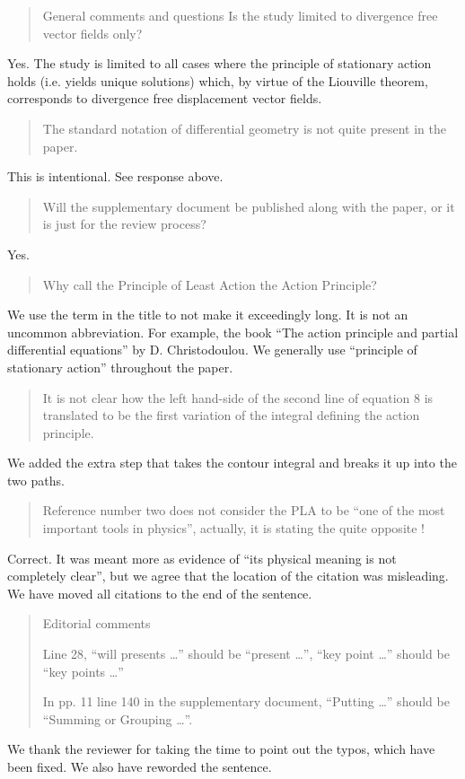 \documentclass[11pt, executivepaper]{article}
\begin{document}
 
\begin{quote}
 General comments and questions
 Is the study limited to divergence free vector fields only? 
\end{quote}
Yes. The study is limited to all cases where the principle of stationary action holds (i.e. yields unique solutions) which, by virtue of the Liouville theorem, corresponds to divergence free displacement vector fields.
 
\begin{quote}
 The standard notation of differential geometry is not quite present in the paper.
\end{quote}
This is intentional. See response above.

\begin{quote}
 Will the supplementary document be published along with the paper, or it is just for the review process? 
\end{quote}
Yes.

\begin{quote}
 Why call the Principle of Least Action the Action Principle? 
\end{quote}
We use the term in the title to not make it exceedingly long. It is not an uncommon abbreviation. For example, the book ``The action principle and partial differential equations'' by D. Christodoulou.  We generally use ``principle of stationary action'' throughout the paper.

\begin{quote}
 It is not clear how the left hand-side of the second line of equation 8 is translated to be the first variation of the integral defining the action principle. 
\end{quote}
We added the extra step that takes the contour integral and breaks it up into the two paths.

\begin{quote}
 Reference number two does not consider the PLA to be “one of the most important tools in physics”, actually, it is stating the quite opposite !
\end{quote}
Correct. It was meant more as evidence of ``its physical meaning is not completely clear'', but we agree that the location of the citation was misleading. We have moved all citations to the end of the sentence.


\begin{quote}
 Editorial comments
 
 Line 28, “will presents …” should be “present …”, “key point …” should be “key points …”

 In pp. 11 line 140 in the supplementary document, “Putting …” should be “Summing or Grouping …”.
\end{quote}
We thank the reviewer for taking the time to point out the typos, which have been fixed. We also have reworded the sentence.
 
\end{document}
